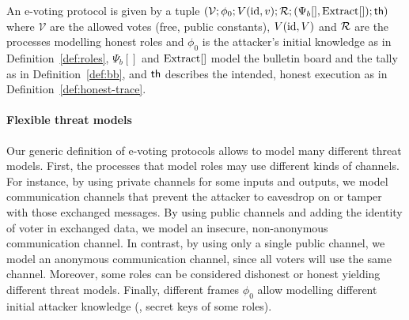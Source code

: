 

\begin{definition}
\label{def:evoting}
  An e-voting protocol is given by a tuple
$
(\mathcal{V};
\phi_0;
V(\mathrm{id},v);
\mathcal{R};
(\Psi_b[],\mathrm{Extract}[]);
\mathsf{th})
$
where $\mathcal{V}$ are
the allowed votes (\ie free, public constants),
$V(\mathrm{id},V)$ and $\mathcal{R}$ are the processes modelling honest roles and $\phi_0$ is the attacker's initial knowledge
as in Definition~\ref{def:roles},
$\Psi_b[]$ and $\mathrm{Extract}[]$ model the bulletin board and the tally as in Definition~\ref{def:bb}, and
$\mathsf{th}$ describes the intended, honest execution as in Definition~\ref{def:honest-trace}.
\end{definition}


\paragraph{\textbf{Flexible threat models}}
Our generic definition of e-voting protocols allows to model many different threat models.
First, the processes that model roles may use different kinds of channels. For instance,
by using private channels for some inputs and outputs, we model communication channels that prevent
the attacker to eavesdrop on or tamper with those exchanged messages.
By using public channels and adding the identity of voter in exchanged data, we model an insecure,
non-anonymous communication channel. In contrast, by using only a single public channel, we model an anonymous
communication channel, since all voters will use the same channel.
Moreover, some roles can be considered dishonest or honest yielding different threat models.
Finally, different frames $\phi_0$ allow modelling different initial attacker knowledge
(\eg, secret keys of some roles).


